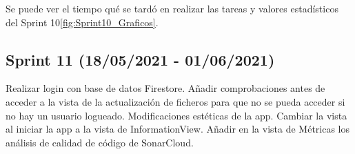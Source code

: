 Se puede ver el tiempo qué se tardó en realizar las tareas y valores estadísticos del Sprint 10\ref{fig:Sprint10_Graficos}.



\subsection{Sprint 11 (18/05/2021 - 01/06/2021)}
Realizar login con base de datos Firestore. Añadir comprobaciones antes de acceder a la vista de la actualización de ficheros para que no se pueda acceder si no hay un usuario logueado. Modificaciones estéticas de la app. Cambiar la vista al iniciar la app a la vista de InformationView. Añadir en la vista de Métricas los análisis de calidad de código de SonarCloud.

